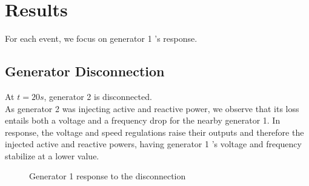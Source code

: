 \documentclass[a4paper, 12pt]{report}
\begin{document}
\newpage
\section{Results}

For each event, we focus on generator 1 's response.

\subsection{Generator Disconnection}
\label{DisconnectGenerator}

At $t=20s$, generator 2 is disconnected.\\

As generator 2 was injecting active and reactive power, we observe that its loss entails both a voltage and a frequency drop for the nearby generator 1. In response, the voltage and speed regulations raise their outputs and therefore the injected active and reactive powers, having generator 1 's voltage and frequency stabilize at a lower value.\\

\begin{figure}[H]
\caption{Generator 1 response to the disconnection}
\end{figure}
\end{document}

